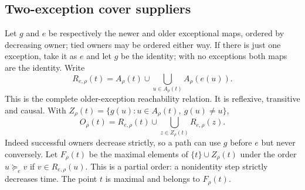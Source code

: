 \subsection{Two-exception cover suppliers}

Let $g$ and $e$ be respectively the newer and older exceptional maps,
ordered by decreasing owner; tied owners may be ordered either way.
If there is just one exception, take it as $e$ and let $g$ be the
identity; with no exceptions both maps are the identity.
Write
\begin{equation}\label{eq:older-closure}
 R_{e,\rho}(t)=A_\rho(t)\cup
                 \bigcup_{u\in A_\rho(t)}A_\rho(e(u)).
\end{equation}
This is the complete older-exception reachability relation. It is
reflexive, transitive and causal. With
$Z_\rho(t)=\{g(u):u\in A_\rho(t),\ g(u)\ne u\}$,
\begin{equation}\label{eq:two-exception-decomposition}
 O_\rho(t)=R_{e,\rho}(t)\cup
                       \bigcup_{z\in Z_\rho(t)}R_{e,\rho}(z).
\end{equation}
Indeed successful owners decrease strictly, so a path can use $g$
before $e$ but never conversely. Let $F_\rho(t)$ be the maximal elements
of $\{t\}\cup Z_\rho(t)$ under the order
$u\succeq_e v$ if $v\in R_{e,\rho}(u)$.
This is a partial order: a nonidentity step strictly decreases time.
The point $t$ is maximal and belongs to $F_\rho(t)$.

